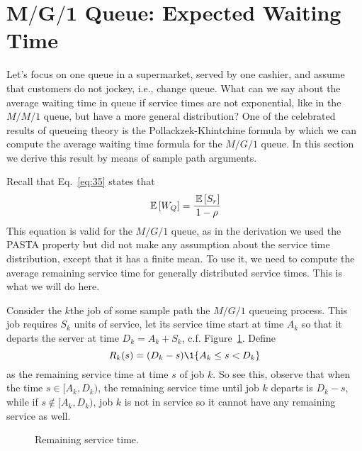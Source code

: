 \section
[$M/G/1$ Queue: Expected Waiting Time]
{$\mathbf{M/G/1}$ Queue: Expected Waiting Time}
\label{sec:mg1}

Let's focus on one queue in a supermarket, served by one cashier, and
assume that customers do not jockey, i.e., change queue. What can we
say about the average waiting time in queue if service times are not
exponential, like in the $M/M/1$ queue, but have a more general
distribution? One of the celebrated results of queueing theory is the
Pollackzek-Khintchine formula by which we can compute the average
waiting time formula for the $M/G/1$ queue. In this section we derive
this result by means of sample path arguments.

Recall that Eq.~\eqref{eq:35} states that
\begin{equation*}
  \,\mathbb{E}\left[W_Q\right] = \frac{\,\mathbb{E}\left[S_r\right]}{1-\rho}
\end{equation*}
This equation is valid for the $M/G/1$ queue, as in the derivation we
used the PASTA property but did not make any assumption about the
service time distribution, except that it has a finite mean. To use
it, we need to compute the average remaining service time for
generally distributed service times. This is what we will do here.

Consider the $k$the job of some sample path the $M/G/1$ queueing
process. This job requires $S_k$ units of service, let its service
time start at time $A_k$ so that it departs the server at time
$D_k=A_k + S_k$, c.f. Figure~\ref{fig:remainingservicetime}. Define
\begin{equation*}
R_k(s) = (D_k-s)\1{A_k \leq s < D_k}
\end{equation*}
as the remaining service time at time $s$ of job $k$. So see this,
observe that when the time $s\in [A_k, D_k)$, the remaining service
time until job $k$ departs is $D_k-s $, while if
$s\not \in [A_k, D_k)$, job $k$ is not in service so it cannot have
any remaining service as well.

\begin{figure}[ht]
  \centering
{}

  \caption{Remaining service time.}
  \label{fig:remainingservicetime}
\end{figure}


